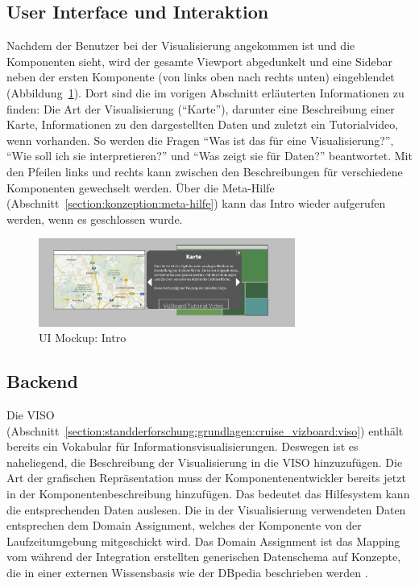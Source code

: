 \documentclass[
	headsepline,
	footsepline,
	fontsize=12pt,
	bibliography=totoc
]{scrbook}
\begin{document}
\subsection{User Interface und Interaktion}
\label{section:konzeption:intro:ui}

Nachdem der Benutzer bei der Visualisierung angekommen ist und die Komponenten sieht, wird der gesamte Viewport abgedunkelt und eine Sidebar neben der ersten Komponente (von links oben nach rechts unten) eingeblendet (Abbildung~\ref{figure:ueberblick}). Dort sind die im vorigen Abschnitt erläuterten Informationen zu finden: Die Art der Visualisierung (\enquote{Karte}), darunter eine Beschreibung einer Karte, Informationen zu den dargestellten Daten und zuletzt ein Tutorialvideo, wenn vorhanden. So werden die Fragen \enquote{Was ist das für eine Visualisierung?}, \enquote{Wie soll ich sie interpretieren?} und \enquote{Was zeigt sie für Daten?} beantwortet. Mit den Pfeilen links und rechts kann zwischen den Beschreibungen für verschiedene Komponenten gewechselt werden. Über die Meta-Hilfe (Abschnitt~\ref{section:konzeption:meta-hilfe}) kann das Intro wieder aufgerufen werden, wenn es geschlossen wurde.

\begin{figure}[htbp]
   \centering
   \includegraphics[width=0.75\textwidth]{images/konzeption-ueberblick.png}
   \caption{UI Mockup: Intro}
   \label{figure:ueberblick}
\end{figure}

\subsection{Backend}
\label{section:konzeption:intro:backend}

Die VISO (Abschnitt~\ref{section:standderforschung:grundlagen:cruise_vizboard:viso}) enthält bereits ein Vokabular für Informationsvisualisierungen. Deswegen ist es naheliegend, die Beschreibung der Visualisierung in die VISO hinzuzufügen. Die Art der grafischen Repräsentation muss der Komponentenentwickler bereits jetzt in der Komponentenbeschreibung hinzufügen. Das bedeutet das Hilfesystem kann die entsprechenden Daten auslesen. Die in der Visualisierung verwendeten Daten entsprechen dem Domain Assignment, welches der Komponente von der Laufzeitumgebung mitgeschickt wird. Das Domain Assignment ist das Mapping vom während der Integration erstellten generischen Datenschema auf Konzepte, die in einer externen Wissensbasis wie der DBpedia beschrieben werden \cite{Voigt2012a}.
\end{document}
